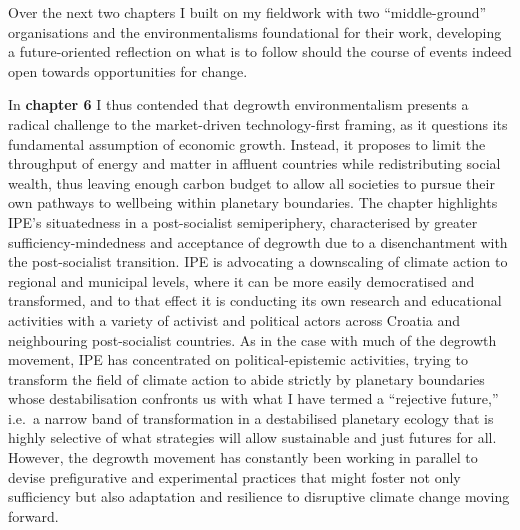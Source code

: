 \documentclass[a4paper, nobind]{templates/ociamthesis}
\begin{document}
Over the next two chapters I built on my fieldwork with two ``middle-ground'' organisations and the environmentalisms foundational for their work, developing a future-oriented reflection on what is to follow should the course of events indeed open towards opportunities for change.

In \textbf{chapter 6} I thus contended that degrowth environmentalism presents a radical challenge to the market-driven technology-first framing, as it questions its fundamental assumption of economic growth. Instead, it proposes to limit the throughput of energy and matter in affluent countries while redistributing social wealth, thus leaving enough carbon budget to allow all societies to pursue their own pathways to wellbeing within planetary boundaries. The chapter highlights IPE's situatedness in a post-socialist semiperiphery, characterised by greater sufficiency-mindedness and acceptance of degrowth due to a disenchantment with the post-socialist transition. IPE is advocating a downscaling of climate action to regional and municipal levels, where it can be more easily democratised and transformed, and to that effect it is conducting its own research and educational activities with a variety of activist and political actors across Croatia and neighbouring post-socialist countries. As in the case with much of the degrowth movement, IPE has concentrated on political-epistemic activities, trying to transform the field of climate action to abide strictly by planetary boundaries whose destabilisation confronts us with what I have termed a ``rejective future,'' i.e.~a narrow band of transformation in a destabilised planetary ecology that is highly selective of what strategies will allow sustainable and just futures for all. However, the degrowth movement has constantly been working in parallel to devise prefigurative and experimental practices that might foster not only sufficiency but also adaptation and resilience to disruptive climate change moving forward.
\end{document}
